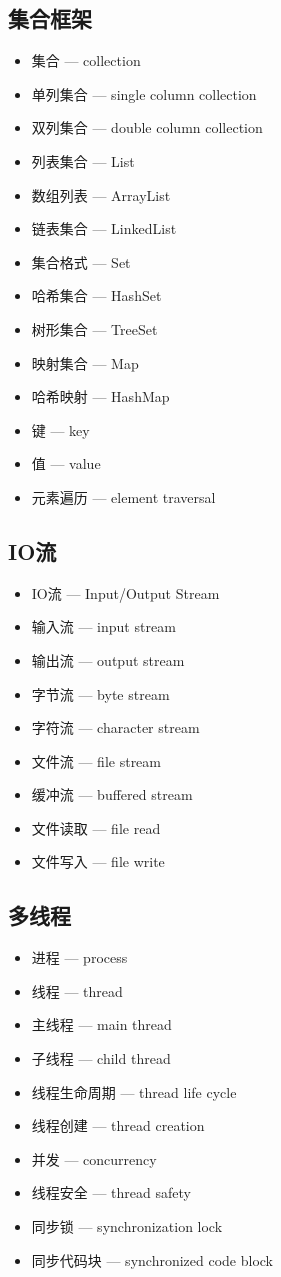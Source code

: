 \subsection{集合框架}
\begin{itemize}
\item 集合 — collection
\item 单列集合 — single column collection
\item 双列集合 — double column collection
\item 列表集合 — List
\item 数组列表 — ArrayList
\item 链表集合 — LinkedList
\item 集合格式 — Set
\item 哈希集合 — HashSet
\item 树形集合 — TreeSet
\item 映射集合 — Map
\item 哈希映射 — HashMap
\item 键 — key
\item 值 — value
\item 元素遍历 — element traversal
\end{itemize}

\subsection{IO流}
\begin{itemize}
\item IO流 — Input/Output Stream
\item 输入流 — input stream
\item 输出流 — output stream
\item 字节流 — byte stream
\item 字符流 — character stream
\item 文件流 — file stream
\item 缓冲流 — buffered stream
\item 文件读取 — file read
\item 文件写入 — file write
\end{itemize}

\subsection{多线程}
\begin{itemize}
\item 进程 — process
\item 线程 — thread
\item 主线程 — main thread
\item 子线程 — child thread
\item 线程生命周期 — thread life cycle
\item 线程创建 — thread creation
\item 并发 — concurrency
\item 线程安全 — thread safety
\item 同步锁 — synchronization lock
\item 同步代码块 — synchronized code block
\end{itemize}

